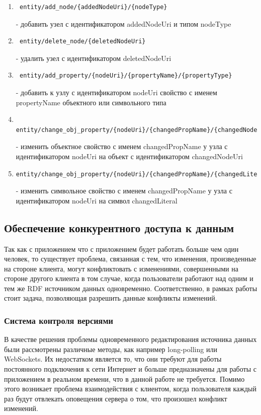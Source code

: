 \documentclass[12pt]{article}
\begin{document}
\begin{enumerate}
    \item \begin{verbatim} entity/add_node/{addedNodeUri}/{nodeType} \end{verbatim}
          - добавить узел с идентификатором addedNodeUri и типом nodeType
    \item \begin{verbatim} entity/delete_node/{deletedNodeUri}\end{verbatim}
          - удалить узел с идентификатором deletedNodeUri
    \item \begin{verbatim} entity/add_property/{nodeUri}/{propertyName}/{propertyType}\end{verbatim}
          - добавить к узлу с идентификатором nodeUri свойство с именем propertyName объектного или символьного типа
    \item \begin{verbatim} entity/change_obj_property/{nodeUri}/{changedPropName}/{changedNodeUri}
\end{verbatim}
          - изменить объектное свойство с именем changedPropName у узла с идентификатором nodeUri на объект с идентификатором changedNodeUri

    \item \begin{verbatim}entity/change_obj_property/{nodeUri}/{changedPropName}/{changedLiteral} 
\end{verbatim}
          - изменить символьное свойство с именем changedPropName у узла с идентификатором nodeUri на символ changedLiteral
\end{enumerate}

\subsection{Обеспечение конкурентного доступа к данным}
Так как с приложением что с приложением будет работать больше чем один человек, то существует проблема, связанная с тем, что изменения, произведенные на стороне клиента, могут конфликтовать с изменениями, совершенными на стороне другого клиента в том случае, когда пользователи работают над одним и тем же RDF источником данных одновременно. Соответственно, в рамках работы стоит задача, позволяющая разрешить данные конфликты изменений.

\subsubsection{Система контроля версиями}
\qquad В качестве решения проблемы одновременного редактирования источника данных были рассмотрены различные методы, как например long-polling или WebSockets. Их недостатком является то, что они требуют для работы постоянного подключения к сети Интернет и больше предназначены для работы с приложением в реальном времени, что в данной работе не требуется. Помимо этого возникает проблема взаимодействия с клиентом, когда пользователя каждый раз будут отвлекать оповещения сервера о том, что произошел конфликт изменений.
\end{document}
